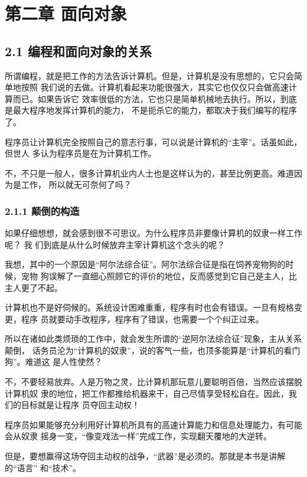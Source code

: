 \documentclass[color=cyan,mathpazo,titlestyle=hang]{elegantbook}
\begin{document}
\section{第二章 面向对象}
\label{sec:org82944ec}

\subsection{2.1 编程和面向对象的关系}
\label{sec:orgb0a3cbc}

所谓编程，就是把工作的方法告诉计算机。但是，计算机是没有思想的，它只会简单地按照
我们说的去做。计算机看起来功能很强大，其实它也仅仅只会做高速计算而已。如果告诉它
效率很低的方法，它也只是简单机械地去执行。所以，到底是最大程序地发挥计算机的能力，
不是扼杀它的能力，都取决于我们编写的程序了。

程序员让计算机完全按照自己的意志行事，可以说是计算机的“主宰”。话虽如此，但世人
多认为程序员是在为计算机工作。

不，不只是一般人，很多计算机业内人士也是这样认为的，甚至比例更高。难道因为是工作，
所以就无可奈何了吗？

\subsubsection{2.1.1 颠倒的构造}
\label{sec:org4e798cb}

如果仔细想想，就会感到很不可思议。为什么程序员非要像计算机的奴隶一样工作呢？ 我
们到底是从什么时候放弃主宰计算机这个念头的呢？

我想，其中的一个原因是“阿尔法综合征”。阿尔法综合征是指在饲养宠物狗的时候，宠物
狗误解了一直细心照顾它的评价的地位，反而感觉到它自己是主人，比主人更了不起。

计算机也不是好伺候的。系统设计困难重重，程序有时也会有错误。一旦有规格变更，程序
员就要动手改程序，程序有了错误，也需要一个个纠正过来。

所以在诸如此类烦琐的工作中，就会发生所谓的“逆阿尔法综合征”现象，主从关系颠倒，
话务员沦为“计算机的奴隶”，说的客气一些，也顶多能算是“计算机的看门狗”。难道这
是人性使然？

不，不要轻易放弃。人是万物之灵，比计算机那玩意儿要聪明百倍，当然应该摆脱计算机奴
隶的地位，把工作都推给机器来干，自己尽情享受轻松自在。因此，我们的目标就是让程序
员夺回主动权！

程序员如果能够充分利用好计算机所具有的高速计算能力和信息处理能力，有可能会从奴隶
摇身一变，“像变戏法一样”完成工作，实现翻天覆地的大逆转。

但是，要想赢得这场夺回主动权的战争，“武器”是必须的。那就是本书是讲解的“语言”
和“技术”。
\end{document}
